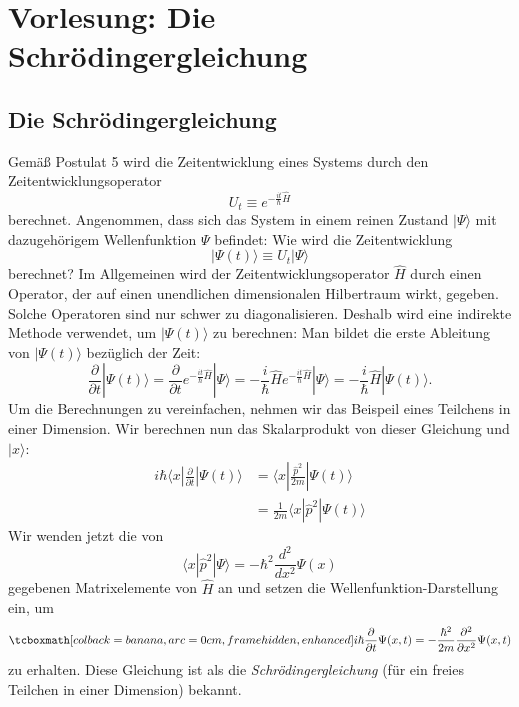 
\section{Vorlesung: Die Schrödingergleichung}



\subsection{Die Schrödingergleichung}
Gemäß Postulat 5 wird die Zeitentwicklung eines Systems durch den Zeitentwicklungsoperator
\begin{equation}
	U_t \equiv e^{-\frac{it}{\hbar}\widehat{H}}
\end{equation}
berechnet. Angenommen, dass sich das System in einem reinen Zustand $|\Psi\rangle$ mit dazugehörigem Wellenfunktion $\Psi$  befindet: Wie wird die Zeitentwicklung 
\begin{equation}
	|\Psi(t)\rangle \equiv U_t|\Psi\rangle
\end{equation}
berechnet? Im Allgemeinen wird der Zeitentwicklungsoperator $\widehat{H}$ durch einen Operator, der auf einen unendlichen dimensionalen Hilbertraum wirkt, gegeben. Solche Operatoren sind nur schwer zu diagonalisieren. Deshalb wird eine indirekte Methode verwendet, um $|\Psi(t)\rangle$ zu berechnen: Man bildet die erste Ableitung von $|\Psi(t)\rangle$ bezüglich der Zeit:
\begin{equation}
	\frac{\partial}{\partial t} |\Psi(t)\rangle = \frac{\partial}{\partial t} e^{-\frac{it}{\hbar}\widehat{H}} |\Psi\rangle = -\frac{i}{\hbar}\widehat{H} e^{-\frac{it}{\hbar}\widehat{H}} |\Psi\rangle = -\frac{i}{\hbar}\widehat{H}|\Psi(t)\rangle.
\end{equation}
Um die Berechnungen zu vereinfachen, nehmen wir das Beispeil eines Teilchens in einer Dimension. Wir berechnen nun das Skalarprodukt von dieser Gleichung und $|x\rangle$:
\begin{equation}
	\begin{split}
		i\hbar \langle x|\frac{\partial}{\partial t} |\Psi(t)\rangle  &= \langle x|\frac{\widehat{p}^2}{2m}|\Psi(t)\rangle \\
		&= \frac{1}{2m}\langle x|\widehat{p}^2|\Psi(t)\rangle 
	\end{split}
\end{equation}
Wir wenden jetzt die von
\begin{equation}
	\langle x|\widehat{p}^2|\Psi\rangle = -\hbar^2\frac{d^2}{dx^2}\Psi(x)
\end{equation}
gegebenen Matrixelemente von $\widehat{H}$ an und setzen die Wellenfunktion-Darstellung ein, um 
\begin{equation}\label{eq:1dfpschr}
	\eqbox{i\hbar\frac{\partial}{\partial t}\Psi(x,t) = -\frac{\hbar^2}{2m}\frac{\partial^2}{\partial x^2}\Psi(x,t)}
\end{equation}
zu erhalten. Diese Gleichung ist als die \emph{Schrödingergleichung} (für ein freies Teilchen in einer Dimension) bekannt.

